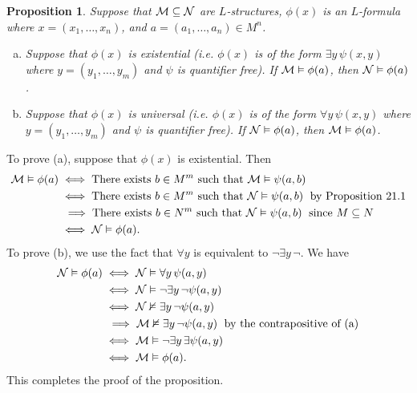 \documentclass[10pt]{article}
\makeatletter
\theoremstyle{newstyle}
\newtheorem{prop}[thm]{Proposition}
\newenvironment{pf}[1][\proofname]{\par
  \pushQED{\qed}%
  \normalfont \topsep0\p@\relax
  \trivlist
  \item[\hskip\labelsep\scshape
  #1\@addpunct{.}]\ignorespaces
}{%
  \popQED\endtrivlist\@endpefalse
}
\makeatother
\begin{document}
\begin{prop}
Suppose that ${\cal M} \subseteq {\cal N}$ are $L$-structures, $\phi(x)$ is an $L$-formula 
where $x = (x_1, \dots, x_n)$, and $a = (a_1, \dots, a_n) \in M^n$.
\begin{enumerate}[(a)]
    \item Suppose that $\phi(x)$ is existential (i.e. $\phi(x)$ is of the form 
    $\exists y \, \psi(x, y)$ where $y = (y_1, \dots, y_m)$ and $\psi$ is quantifier free). 
    If ${\cal M} \vDash \phi(a)$, then ${\cal N} \vDash \phi(a)$.
    \item Suppose that $\phi(x)$ is universal (i.e. $\phi(x)$ is of the form 
    $\forall y \, \psi(x, y)$ where $y = (y_1, \dots, y_m)$ and $\psi$ is quantifier free). 
    If ${\cal N} \vDash \phi(a)$, then ${\cal M} \vDash \phi(a)$.
\end{enumerate}
\end{prop}
\begin{pf}
To prove (a), suppose that 
$\phi(x)$ is existential. Then 
\begin{align*}
    {\cal M} \vDash \phi(a) &\iff \text{There exists $b \in M^m$ such that ${\cal M} \vDash 
    \psi(a, b)$} \\
    &\iff \text{There exists $b \in M^m$ such that ${\cal N} \vDash \psi(a, b)$} \; 
    \text{ by Proposition 21.1} \\ 
    &\;\;\Longrightarrow\;\text{There exists $b \in N^m$ such that ${\cal N} \vDash \psi(a, b)$} \; 
    \text{ since $M \subseteq N$} \\ 
    &\iff {\cal N} \vDash \phi(a).
\end{align*}
To prove (b), we use the fact that $\forall y$ is equivalent to $\neg \exists y \, \neg$. We have 
\begin{align*}
    {\cal N} \vDash \phi(a) &\iff {\cal N} \vDash \forall y \, \psi(a, y) \\ 
    &\iff {\cal N} \vDash \neg \exists y \, \neg \psi(a, y) \\ 
    &\iff {\cal N} \nvDash \exists y \, \neg \psi(a, y) \\ 
    &\;\;\Longrightarrow\; {\cal M} \nvDash \exists y \, \neg \psi(a, y) \;\text{ by the contrapositive of (a)} \\ 
    &\iff {\cal M} \vDash \neg \exists y \, \exists \psi(a, y) \\ 
    &\iff {\cal M} \vDash \phi(a).
\end{align*}
This completes the proof of the proposition.
\end{pf}
\end{document}
